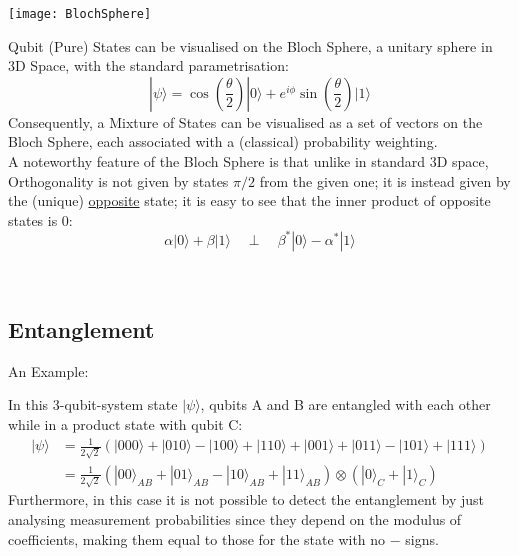 \documentclass[a4paper,12pt]{article}
\begin{document}
\begin{minipage}{0.5\textwidth} \centering
    \texttt{[image: BlochSphere]}
    \label{fig:BlochSphere}
\end{minipage}
\begin{minipage}{0.5\textwidth}

Qubit (Pure) States can be visualised on the Bloch Sphere, a unitary sphere in 3D Space, with the standard parametrisation:
$$
    |\psi\rangle = \cos\left(\frac{\theta}{2}\right) |0\rangle + e^{i\phi} \sin\left(\frac{\theta}{2}\right) |1\rangle
$$
Consequently, a Mixture of States can be visualised as a set of vectors on the Bloch Sphere, each associated with a (classical)
probability weighting.\\

A noteworthy feature of the Bloch Sphere is that unlike in standard 3D space, Orthogonality is not given by states $\pi/2$ from
the given one; it is instead given by the (unique) \underline{opposite} state;
it is easy to see that the inner product of opposite states is 0:
\begin{equation}\label{eq:OrthState}
    \alpha |0\rangle + \beta |1\rangle \quad \perp \quad \beta^{*} |0\rangle - \alpha^{*} |1\rangle
\end{equation}

\end{minipage}\\[0.5cm]



\subsection{Entanglement}
\label{sec:SubEntanglement}

An Example:

\begin{exmp}\label{ex:Entanglement}
    In this 3-qubit-system state $|\psi\rangle$, qubits A and B are entangled with each other while in a product state with qubit C:
    \begin{align*}
        |\psi\rangle & = \frac{1}{2\sqrt{2}} (|000\rangle + |010\rangle - |100\rangle + |110\rangle + |001\rangle + |011\rangle - |101\rangle + |111\rangle) \\
                    & = \frac{1}{2\sqrt{2}} (|00\rangle_{AB} + |01\rangle_{AB} - |10\rangle_{AB} + |11\rangle_{AB}) \otimes (|0\rangle_{C} + |1\rangle_{C})
    \end{align*}
    Furthermore, in this case it is not possible to detect the entanglement by just analysing measurement probabilities since they depend on the
    modulus of coefficients, making them equal to those for the state with no $-$ signs.
\end{exmp}
\end{document}
